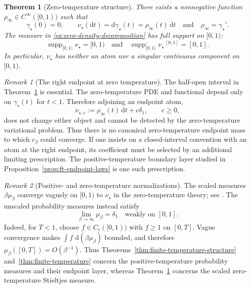 \documentclass[10pt]{amsart}
\newtheorem{theorem}{Theorem}[section]
\theoremstyle{definition}
\theoremstyle{remark}
\newtheorem{remark}[remark]{Remark}
\numberwithin{equation}{section}
\newcommand{\1}{\mathbf 1}
\newcommand{\supp}{\operatorname{supp}}
\newcommand{\dd}{\,\mathrm d}
\begin{document}
\begin{theorem}[Zero-temperature structure]
\label{thm:zero-temperature}
There exists a nonnegative function $\rho_\infty\in C^\infty([0,1))$ such that
\begin{equation}
 \gamma_\star(0)=0,
 \qquad
 \nu_\star(\mathrm d t)=\mathrm d\gamma_\star(t)=\rho_\infty(t)\dd t
 \quad\text{and}\quad
 \rho_\infty=\gamma_\star'.
 \label{eq:zero-density-decomposition}
\end{equation}
The measure in \eqref{eq:zero-density-decomposition} has full support on $[0,1)$:
\begin{equation}
 \supp_{[0,1)}\nu_\star=[0,1)
 \quad\text{and}\quad
 \overline{\supp_{[0,1)}\nu_\star}^{\,[0,1]}=[0,1].
\label{eq:zero-main}
\end{equation}
In particular, $\nu_\star$ has neither an atom nor a singular continuous component on $[0,1)$.
\end{theorem}

\begin{remark}[The right endpoint at zero temperature]
\label{rem:zero-endpoint-convention}
The half-open interval in Theorem~\ref{thm:zero-temperature} is essential.  The zero-temperature PDE and functional depend only on $\gamma_\star(t)$ for $t<1$.  Therefore adjoining an endpoint atom,
\begin{equation*}
 \overline\nu_{\star,c}
 :=\rho_\infty(t)\dd t+c\delta_1,
 \qquad c\geq0,
\end{equation*}
does not change either object and cannot be detected by the zero-temperature variational problem.  Thus there is no canonical zero-temperature endpoint mass to which $c_\beta$ could converge.  If one insists on a closed-interval convention with an atom at the right endpoint, its coefficient must be selected by an additional limiting prescription.  The positive-temperature boundary layer studied in Proposition~\ref{prop:ft-endpoint-laws} is one such prescription.
\end{remark}

\begin{remark}[Positive- and zero-temperature normalizations]
\label{rem:normalizations}
The scaled measures $\beta\mu_\beta$ converge vaguely on $[0,1)$ to $\nu_\star$ in the zero-temperature theory; see \cite[proof of Theorem 2]{AuffingerChenZeng}. The unscaled probability measures instead satisfy
\begin{equation*}
\lim_{\beta\to\infty}\mu_\beta=\delta_1
\quad\text{weakly on }[0,1].
\end{equation*}
Indeed, for $T<1$, choose $f\in C_c([0,1))$ with $f\geq1$ on $[0,T]$. Vague convergence makes $\int f\,\dd(\beta\mu_\beta)$ bounded, and therefore $\mu_\beta([0,T])=O(\beta^{-1})$. Thus Theorems~\ref{thm:finite-temperature-structure} and~\ref{thm:finite-temperature} concern the positive-temperature probability measures and their endpoint layer, whereas Theorem~\ref{thm:zero-temperature} concerns the scaled zero-temperature Stieltjes measure.
\end{remark}
\end{document}
